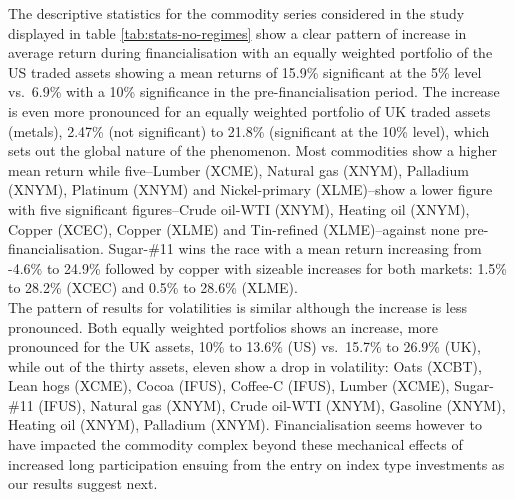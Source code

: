 \documentclass[]{elsarticle} %
\begin{document}
The descriptive statistics for the commodity series considered in the study displayed in table \ref{tab:stats-no-regimes} show a clear pattern of increase in average return during financialisation with an equally weighted portfolio of the US traded assets showing a mean returns of 15.9\% significant at the 5\% level vs.~6.9\% with a 10\% significance in the pre-financialisation period. The increase is even more pronounced for an equally weighted portfolio of UK traded assets (metals), 2.47\% (not significant) to 21.8\% (significant at the 10\% level), which sets out the global nature of the phenomenon. Most commodities show a higher mean return while five--Lumber (XCME), Natural gas (XNYM), Palladium (XNYM), Platinum (XNYM) and Nickel-primary (XLME)--show a lower figure with five significant figures--Crude oil-WTI (XNYM), Heating oil (XNYM), Copper (XCEC), Copper (XLME) and Tin-refined (XLME)--against none pre-financialisation. Sugar-\#11 wins the race with a mean return increasing from -4.6\% to 24.9\% followed by copper with sizeable increases for both markets: 1.5\% to 28.2\% (XCEC) and 0.5\% to 28.6\% (XLME).\\
The pattern of results for volatilities is similar although the increase is less pronounced. Both equally weighted portfolios shows an increase, more pronounced for the UK assets, 10\% to 13.6\% (US) vs.~15.7\% to 26.9\% (UK), while out of the thirty assets, eleven show a drop in volatility: Oats (XCBT), Lean hogs (XCME), Cocoa (IFUS), Coffee-C (IFUS), Lumber (XCME), Sugar-\#11 (IFUS), Natural gas (XNYM), Crude oil-WTI (XNYM), Gasoline (XNYM), Heating oil (XNYM), Palladium (XNYM). Financialisation seems however to have impacted the commodity complex beyond these mechanical effects of increased long participation ensuing from the entry on index type investments as our results suggest next.

\medskip\setlength{\parindent}{0pt}
\end{document}

